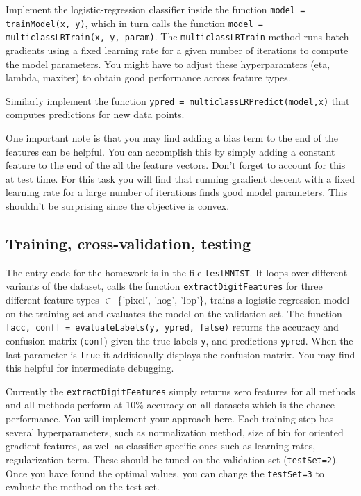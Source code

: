 \documentclass[10pt,letterpaper]{article}
\newcommand{\cmd}[1] {{\color{blue}\texttt{#1}}}
\begin{document}
Implement the logistic-regression classifier inside the function \cmd{model = trainModel(x, y)}, which in turn calls the function \cmd{model = multiclassLRTrain(x, y, param)}. The \cmd{multiclassLRTrain} method runs batch gradients using a fixed learning rate for a given number of iterations to compute the model parameters. You might have to adjust these hyperparamters (eta, lambda, maxiter) to obtain good performance across feature types.

Similarly implement the function \cmd{ypred = multiclassLRPredict(model,x)} that computes predictions for new data points.

One important note is that you may find adding a bias term to the end of the features can be helpful. You can accomplish this by simply adding a constant feature to the end of the all the feature vectors. Don't forget to account for this at test time. For this task you will find that running gradient descent with a fixed learning rate for a large number of iterations finds good model parameters. This shouldn't be surprising since the objective is convex.

\subsection{Training, cross-validation, testing}

The entry code for the homework is in the file \cmd{testMNIST}. It loops over different  variants of the dataset, calls the function \cmd{extractDigitFeatures} for three different feature types $\in$ \{'pixel', 'hog', 'lbp'\}, trains a logistic-regression model on the training set and evaluates the model on the validation set. The function 
\cmd{[acc, conf] = evaluateLabels(y, ypred, false)} returns the accuracy and confusion matrix (\cmd{conf}) given the true labels \cmd{y}, and predictions \cmd{ypred}. When the last parameter is \cmd{true} it additionally displays the confusion matrix. You may find this helpful for intermediate debugging.

Currently the \cmd{extractDigitFeatures} simply returns zero features for all methods  and all methods perform at 10\% accuracy on all datasets which is the chance performance. You will implement your approach here. Each training step has several hyperparameters, such as normalization method, size of bin for oriented gradient features, as well as classifier-specific ones such as learning rates, regularization term. These should be tuned on the validation set (\cmd{testSet=2}). Once you have found the optimal values, you can change the \cmd{testSet=3} to evaluate the method on the test set.
\end{document}
